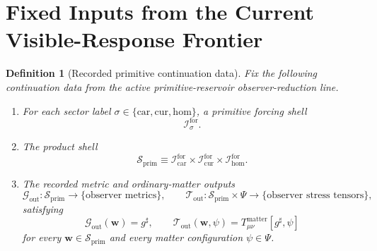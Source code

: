 \documentclass[11pt]{article}
\newcommand{\CompletedMetric}{g^{\sharp}}
\newcommand{\MatterSpace}{\Psi}
\newcommand{\Car}{\mathrm{car}}
\newcommand{\Cur}{\mathrm{cur}}
\newcommand{\Hom}{\mathrm{hom}}
\newcommand{\ForSpace}[1]{\mathcal I_{#1}^{\mathrm{for}}}
\newcommand{\PrimShell}{\mathcal S_{\mathrm{prim}}}
\newcommand{\MetricOut}{\mathscr G_{\mathrm{out}}}
\newcommand{\MatterOut}{\mathscr T_{\mathrm{out}}}
\newtheorem{definition}{Definition}
\begin{document}
\section{Fixed Inputs from the Current Visible-Response Frontier}

\begin{definition}[Recorded primitive continuation data]
\label{def:fixed}
Fix the following continuation data from the active primitive-reservoir observer-reduction line.
\begin{enumerate}
    \item For each sector label \(\sigma\in\{\Car,\Cur,\Hom\}\), a primitive forcing shell
    \[
    \ForSpace{\sigma}.
    \]
    \item The product shell
    \[
    \PrimShell
    \equiv
    \ForSpace{\Car}\times \ForSpace{\Cur}\times \ForSpace{\Hom}.
    \]
    \item The recorded metric and ordinary-matter outputs
    \[
    \MetricOut:\PrimShell\to\{\text{observer metrics}\},
    \qquad
    \MatterOut:\PrimShell\times\MatterSpace\to\{\text{observer stress tensors}\},
    \]
    satisfying
    \begin{equation}
    \MetricOut(\mathbf w)=\CompletedMetric,
    \qquad
    \MatterOut(\mathbf w,\psi)
    =
    T_{\mu\nu}^{\mathrm{matter}}[\CompletedMetric,\psi]
    \label{eq:fixedoutputs}
    \end{equation}
    for every \(\mathbf w\in\PrimShell\) and every matter configuration \(\psi\in\MatterSpace\).
\end{enumerate}
\end{definition}
\end{document}
